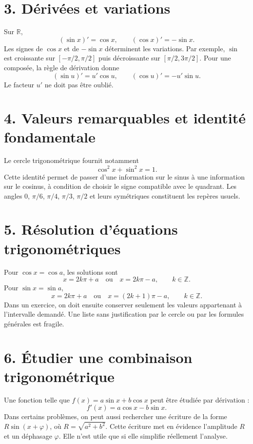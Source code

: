 
\section{3. Dérivées et variations}
Sur $\mathbb{R}$,
\[
(\sin x)'=\cos x,\qquad (\cos x)'=-\sin x.
\]
Les signes de $\cos x$ et de $-\sin x$ déterminent les variations. Par exemple, $\sin$ est croissante sur $[-\pi/2,\pi/2]$ puis décroissante sur $[\pi/2,3\pi/2]$. Pour une composée, la règle de dérivation donne
\[
(\sin u)'=u'\cos u,\qquad (\cos u)'=-u'\sin u.
\]
Le facteur $u'$ ne doit pas être oublié.

\section{4. Valeurs remarquables et identité fondamentale}
Le cercle trigonométrique fournit notamment
\[
\cos^2 x+\sin^2 x=1.
\]
Cette identité permet de passer d’une information sur le sinus à une information sur le cosinus, à condition de choisir le signe compatible avec le quadrant. Les angles $0$, $\pi/6$, $\pi/4$, $\pi/3$, $\pi/2$ et leurs symétriques constituent les repères usuels.

\section{5. Résolution d’équations trigonométriques}
Pour $\cos x=\cos a$, les solutions sont
\[
x=2k\pi+a\quad\text{ou}\quad x=2k\pi-a,\qquad k\in\mathbb{Z}.
\]
Pour $\sin x=\sin a$,
\[
x=2k\pi+a\quad\text{ou}\quad x=(2k+1)\pi-a,\qquad k\in\mathbb{Z}.
\]
Dans un exercice, on doit ensuite conserver seulement les valeurs appartenant à l’intervalle demandé. Une liste sans justification par le cercle ou par les formules générales est fragile.


\section{6. Étudier une combinaison trigonométrique}
Une fonction telle que $f(x)=a\sin x+b\cos x$ peut être étudiée par dérivation :
\[
f'(x)=a\cos x-b\sin x.
\]
Dans certains problèmes, on peut aussi rechercher une écriture de la forme $R\sin(x+\varphi)$, où $R=\sqrt{a^2+b^2}$. Cette écriture met en évidence l’amplitude $R$ et un déphasage $\varphi$. Elle n’est utile que si elle simplifie réellement l’analyse.


